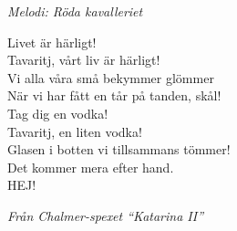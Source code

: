{\footnotesize\textit{Melodi: Röda kavalleriet}}\par
\vspace{10pt}
\revrpt Livet är härligt!\\
Tavaritj, vårt liv är härligt!\\
Vi alla våra små bekymmer glömmer\\
När vi har fått en tår på tanden, skål!\\
Tag dig en vodka!\\
Tavaritj, en liten vodka!\\
Glasen i botten vi tillsammans tömmer!\\
Det kommer mera efter hand.\rpt\\
HEJ!\par
\vspace{10pt}
{\footnotesize\textit{Från Chalmer-spexet ``Katarina II''}}
